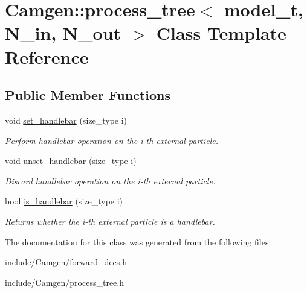 \hypertarget{a00431}{\section{Camgen\-:\-:process\-\_\-tree$<$ model\-\_\-t, N\-\_\-in, N\-\_\-out $>$ Class Template Reference}
\label{a00431}
}
\subsection*{Public Member Functions}
\begin{DoxyCompactItemize}
\item 
\hypertarget{a00431_a11d10e76cdda389030648fca67f4654d}{void \hyperlink{a00431_a11d10e76cdda389030648fca67f4654d}{set\-\_\-handlebar} (size\-\_\-type i)}\label{a00431_a11d10e76cdda389030648fca67f4654d}

\begin{DoxyCompactList}\small\item\em Perform handlebar operation on the i-\/th external particle. \end{DoxyCompactList}\item 
\hypertarget{a00431_a0587b1d77732ece6570b7b6a46cd2725}{void \hyperlink{a00431_a0587b1d77732ece6570b7b6a46cd2725}{unset\-\_\-handlebar} (size\-\_\-type i)}\label{a00431_a0587b1d77732ece6570b7b6a46cd2725}

\begin{DoxyCompactList}\small\item\em Discard handlebar operation on the i-\/th external particle. \end{DoxyCompactList}\item 
\hypertarget{a00431_aefff11915d6f8edaf0e03f95691ed88d}{bool \hyperlink{a00431_aefff11915d6f8edaf0e03f95691ed88d}{is\-\_\-handlebar} (size\-\_\-type i)}\label{a00431_aefff11915d6f8edaf0e03f95691ed88d}

\begin{DoxyCompactList}\small\item\em Returns whether the i-\/th external particle is a handlebar. \end{DoxyCompactList}\end{DoxyCompactItemize}


The documentation for this class was generated from the following files\-:\begin{DoxyCompactItemize}
\item 
include/\-Camgen/forward\-\_\-decs.\-h\item 
include/\-Camgen/process\-\_\-tree.\-h\end{DoxyCompactItemize}
